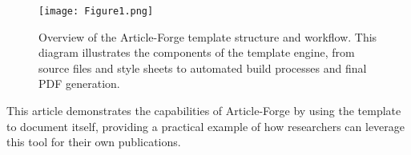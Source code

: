 \begin{figure}[htbp]
    \centering
    \texttt{[image: Figure1.png]}
    \caption{Overview of the Article-Forge template structure and workflow. This diagram illustrates the components of the template engine, from source files and style sheets to automated build processes and final PDF generation.}
    \label{fig:example}
\end{figure}

This article demonstrates the capabilities of Article-Forge by using the template to document itself, providing a practical example of how researchers can leverage this tool for their own publications.
